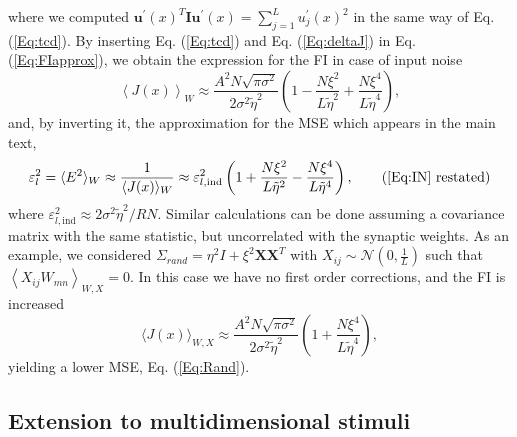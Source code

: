 \documentclass[a4paper]{article}%
\begin{document}
where we computed $\mathbf{u^{\prime}}(x)^{T} \mathbf{I} \mathbf{u^{\prime}%
}(x) = \sum_{j=1}^{L} u^{\prime}_{j}(x)^{2} $ in the same way of Eq.
(\ref{Eq:tcd}). By inserting Eq. (\ref{Eq:tcd}) and Eq. (\ref{Eq:deltaJ}) in
Eq. (\ref{Eq:FIapprox}), we obtain the expression for the FI in case of input
noise
\begin{equation}
\left\langle J(x)\right\rangle _{W} \approx\frac{ A^{2} N \sqrt{\pi\sigma^{2}%
}}{2 \sigma^{2}\tilde\eta^{2}}\left(  1 -\frac{N\xi^{2}}{L\tilde\eta^{2}}+
\frac{N\xi^{4}}{L\tilde\eta^{4}}\right)  ,
\end{equation}
and, by inverting it, the approximation for the MSE which appears in the main
text,
\begin{equation}
\varepsilon_{l}^{2} = \langle E^{2}\rangle_{W} \approx\frac{1}{\langle
J(x)\rangle_{W}} \approx\varepsilon_{l,\text{ind}}^{2} \left(  1+\frac
{N\xi^{2}}{L\tilde\eta^{2}} - \frac{N\xi^{4}}{L\tilde\eta^{4}}\right)  ,
\tag{\ref{Eq:IN} restated}%
\end{equation}
where $\varepsilon_{l,\text{ind}}^{2} \approx2\sigma^{2}\tilde\eta^{2}/R N. $
Similar calculations can be done assuming a covariance matrix with the same
statistic, but uncorrelated with the synaptic weights. As an example, we
considered $\Sigma_{rand} = \eta^{2} I + \xi^{2} \mathbf{X}\mathbf{X}^{T}$
with $X_{ij} \sim\mathcal{N}(0,\frac{1}{L})$ such that $\left\langle
X_{ij}W_{mn}\right\rangle _{W,X}= 0$. In this case we have no first order
corrections, and the FI is increased
\begin{equation}
\langle J(x)\rangle_{W,X} \approx\frac{A^{2} N \sqrt{\pi\sigma^{2}}}{2
\sigma^{2}\tilde\eta^{2}}\left(  1 + \frac{N\xi^{4}}{L\tilde\eta^{4}}\right)
,
\end{equation}
yielding a lower MSE, Eq. (\ref{Eq:Rand}).

\subsection*{Extension to multidimensional stimuli}
\end{document}
